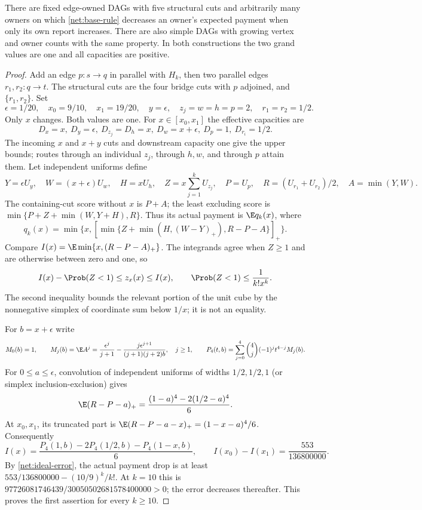 \begin{theorem}
\label{net:wheatstone-failure}
There are fixed edge-owned DAGs with five structural cuts and arbitrarily
many owners on which \eqref{net:base-rule} decreases an owner's expected
payment when only its own report increases.  There are also simple DAGs
with growing vertex and owner counts with the same property.  In both
constructions the two grand values are one and all capacities are positive.
\end{theorem}
\begin{proof}
Add an edge $p:s\to q$ in parallel with $H_k$, then two parallel edges
$r_1,r_2:q\to t$.  The structural cuts are the four bridge cuts with $p$
adjoined, and $\{r_1,r_2\}$.  Set
\[
 \epsilon=1/20,\quad x_0=9/10,\quad x_1=19/20,\quad y=\epsilon,
 \quad z_j=w=h=p=2,\quad r_1=r_2=1/2.
\]
Only $x$ changes.  Both values are one.  For $x\in[x_0,x_1]$ the effective
capacities are
\[
 D_x=x,\ D_y=\epsilon,\ D_{z_j}=D_h=x,\ D_w=x+\epsilon,
 \ D_p=1,\ D_{r_i}=1/2.
\]
The incoming $x$ and $x+y$ cuts and downstream capacity one give the upper
bounds; routes through an individual $z_j$, through $h,w$, and through $p$
attain them.  Let independent uniforms define
\[
 Y=\epsilon U_y,\quad W=(x+\epsilon)U_w,\quad H=xU_h,\quad
 Z=x\sum_{j=1}^kU_{z_j},\quad P=U_p,\quad
 R=(U_{r_1}+U_{r_2})/2,\quad A=\min(Y,W).
\]
The containing-cut score without $x$ is $P+A$; the least excluding score
is $\min\{P+Z+\min(W,Y+H),R\}$.  Thus its actual payment is $\E q_k(x)$,
where
\begin{equation}\label{net:wheatstone-q}
 q_k(x)=\min\{x,[\min\{Z+\min(H,(W-Y)_+),R-P-A\}]_+\}.
\end{equation}
Compare $I(x)=\E\min\{x,(R-P-A)_+\}$.  The integrands agree when $Z\ge1$
and are otherwise between zero and one, so
\begin{equation}\label{net:ideal-error}
 I(x)-\Prob(Z<1)\le z_x(x)\le I(x),\qquad
 \Prob(Z<1)\le\frac1{k!x^k}.
\end{equation}
The second inequality bounds the relevant portion of the unit cube by the
nonnegative simplex of coordinate sum below $1/x$; it is not an equality.

For $b=x+\epsilon$ write
\[
 M_0(b)=1,\qquad
 M_j(b)=\E A^j=\frac{\epsilon^j}{j+1}
       -\frac{j\epsilon^{j+1}}{(j+1)(j+2)b},\quad j\ge1,
 \qquad P_4(t,b)=\sum_{j=0}^4\binom4j(-1)^jt^{4-j}M_j(b).
\]
For $0\le a\le\epsilon$, convolution of independent uniforms of widths
$1/2,1/2,1$ (or simplex inclusion-exclusion) gives
\[
 \E(R-P-a)_+=\frac{(1-a)^4-2(1/2-a)^4}{6}.
\]
At $x_0,x_1$, its truncated part is
$\E(R-P-a-x)_+=(1-x-a)^4/6$.
Consequently
\[
 I(x)=\frac{P_4(1,b)-2P_4(1/2,b)-P_4(1-x,b)}6,
 \qquad I(x_0)-I(x_1)=\frac{553}{136800000}.
\]
By \eqref{net:ideal-error}, the actual payment drop is at least
$553/136800000-(10/9)^k/k!$.
At $k=10$ this is
$97726081746439/30050502681578400000>0$; the error decreases thereafter.
This proves the first assertion for every $k\ge10$.


\end{proof}

